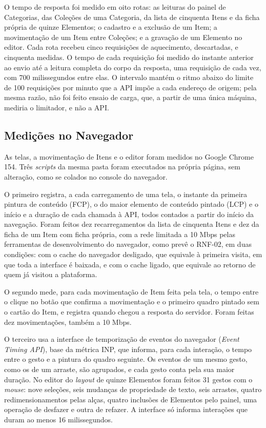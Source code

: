 O tempo de resposta foi medido em oito rotas: as leituras do painel de Categorias, das Coleções de uma Categoria, da lista de cinquenta Itens e da ficha própria de quinze Elementos; o cadastro e a exclusão de um Item; a movimentação de um Item entre Coleções; e a gravação de um Elemento no editor. Cada rota recebeu cinco requisições de aquecimento, descartadas, e cinquenta medidas. O tempo de cada requisição foi medido do instante anterior ao envio até a leitura completa do corpo da resposta, uma requisição de cada vez, com 700 milissegundos entre elas. O intervalo mantém o ritmo abaixo do limite de 100 requisições por minuto que a API impõe a cada endereço de origem; pela mesma razão, não foi feito ensaio de carga, que, a partir de uma única máquina, mediria o limitador, e não a API.

\subsection{Medições no Navegador}

As telas, a movimentação de Itens e o editor foram medidos no Google Chrome 154. Três \textit{scripts} da mesma pasta foram executados na própria página, sem alteração, como se colados no console do navegador.

O primeiro registra, a cada carregamento de uma tela, o instante da primeira pintura de conteúdo (FCP), o do maior elemento de conteúdo pintado (LCP) e o início e a duração de cada chamada à API, todos contados a partir do início da navegação. Foram feitos dez recarregamentos da lista de cinquenta Itens e dez da ficha de um Item com ficha própria, com a rede limitada a 10 Mbps pelas ferramentas de desenvolvimento do navegador, como prevê o RNF-02, em duas condições: com o cache do navegador desligado, que equivale à primeira visita, em que toda a interface é baixada, e com o cache ligado, que equivale ao retorno de quem já visitou a plataforma.

O segundo mede, para cada movimentação de Item feita pela tela, o tempo entre o clique no botão que confirma a movimentação e o primeiro quadro pintado sem o cartão do Item, e registra quando chegou a resposta do servidor. Foram feitas dez movimentações, também a 10 Mbps.

O terceiro usa a interface de temporização de eventos do navegador (\textit{Event Timing API}), base da métrica INP, que informa, para cada interação, o tempo entre o gesto e a pintura do quadro seguinte. Os eventos de um mesmo gesto, como os de um arraste, são agrupados, e cada gesto conta pela sua maior duração. No editor do \textit{layout} de quinze Elementos foram feitos 31 gestos com o \textit{mouse}: nove seleções, seis mudanças de propriedade de texto, seis arrastes, quatro redimensionamentos pelas alças, quatro inclusões de Elementos pelo painel, uma operação de desfazer e outra de refazer. A interface só informa interações que duram ao menos 16 milissegundos.

